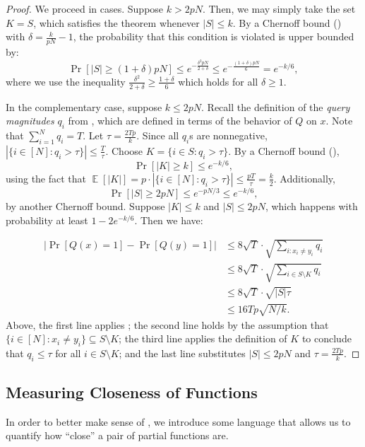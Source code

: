 \documentclass[11pt]{article}%
\newcommand{\E}{\mathop{\mathbb{E}}}
\begin{document}
\begin{proof}
We proceed in cases. Suppose $k > 2pN$. Then, we may simply take the set $K = S$, which satisfies the theorem whenever $|S| \le k$. By a Chernoff bound () with $\delta = \frac{k}{pN} - 1$, the probability that this condition is violated is upper bounded by:
\[
\Pr\left[|S| \ge (1 + \delta)pN\right] \le e^{-\frac{\delta^2 pN}{2 + \delta}} \le e^{-\frac{(1 + \delta) pN}{6}} = e^{-k/6},
\]
where we use the inequality $\frac{\delta^2}{2+\delta} \ge \frac{1 + \delta}{6}$ which holds for all $\delta \ge 1$.

In the complementary case, suppose $k \le 2pN$. Recall the definition of the \textit{query magnitudes} $q_i$ from , which are defined in terms of the behavior of $Q$ on $x$. Note that $\sum_{i=1}^N q_i = T$. Let $\tau = \frac{2Tp}{k}$. Since all $q_i$s are nonnegative, $|\{i \in [N] : q_i > \tau\}| \le \frac{T}{\tau}$. Choose $K = \{i \in S : q_i > \tau\}$. By a Chernoff bound (),
\[ \Pr\left[ |K| \ge k \right] \le e^{-k/6}, \]
using the fact that $\E\left[ \left|K\right| \right] = p \cdot |\{i \in [N] : q_i > \tau\}| \le \frac{p T}{\tau} = \frac{k}{2}$. Additionally,
\[ \Pr\left[ |S| \ge 2p N \right] \le e^{-p N/3} \le e^{-k/6}, \]
by another Chernoff bound. Suppose $|K| \le k$ and $|S| \le 2p N$, which happens with probability at least $1 - 2e^{-k/6}$. Then we have:

\begin{align*}
\left|\Pr\left[Q(x) = 1 \right] - \Pr\left[Q(y) = 1 \right] \right| & \le 8\sqrt{T} \cdot \sqrt{\sum_{i : x_i \neq y_i} q_i}\\
&\le 8\sqrt{T} \cdot \sqrt{\sum_{i \in S \setminus K} q_i}\\
&\le 8\sqrt{T} \cdot \sqrt{|S| \tau}\\
&\le 16Tp\sqrt{N/k}.
\end{align*}
Above, the first line applies ; the second line holds by the assumption that $\{i \in [N] : x_i \neq y_i\} \subseteq S \setminus K$; the third line applies the definition of $K$ to conclude that $q_i \le \tau$ for all $i \in S \setminus K$; and the last line substitutes $|S| \le 2pN$ and $\tau = \frac{2Tp}{k}$.
\end{proof}


\subsection{Measuring Closeness of Functions}
\label{sec:closeness}
In order to better make sense of , we introduce some language that allows us to quantify how ``close'' a pair of partial functions are.
\end{document}
